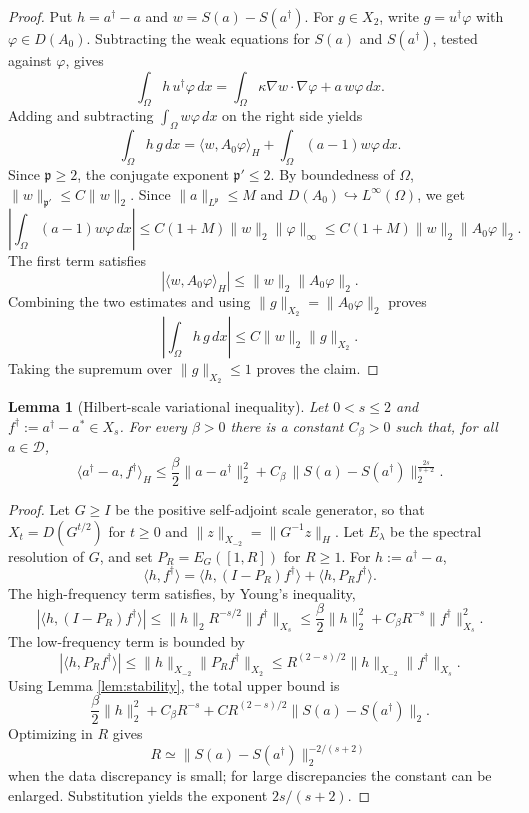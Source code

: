 \documentclass[11pt]{article}
\newtheorem{lemma}{Lemma}
\newcommand{\ip}[2]{\langle #1,#2\rangle}
\newcommand{\fp}{\mathfrak p}
\begin{document}
\begin{proof}
Put \(h=a^\dagger-a\) and \(w=S(a)-S(a^\dagger)\). For \(g\in X_2\), write
\(g=u^\dagger\varphi\) with \(\varphi\in D(A_0)\). Subtracting the weak
equations for \(S(a)\) and \(S(a^\dagger)\), tested against \(\varphi\), gives
\[
  \int_\Omega h\,u^\dagger\varphi\,dx
  =\int_\Omega \kappa\nabla w\cdot\nabla\varphi+a\,w\varphi\,dx .
\]
Adding and subtracting \(\int_\Omega w\varphi\,dx\) on the right side yields
\[
  \int_\Omega h\,g\,dx
  =\ip{w}{A_0\varphi}_H+\int_\Omega (a-1)w\varphi\,dx .
\]
Since \(\fp\ge2\), the conjugate exponent \(\fp'\le2\). By boundedness of
\(\Omega\), \(\|w\|_{\fp'}\leq C\|w\|_2\). Since \(\|a\|_{L^\fp}\le M\) and
\(D(A_0)\hookrightarrow L^\infty(\Omega)\), we get
\[
  \left|\int_\Omega (a-1)w\varphi\,dx\right|
  \leq C(1+M)\|w\|_2\|\varphi\|_\infty
  \leq C(1+M)\|w\|_2\|A_0\varphi\|_2 .
\]
The first term satisfies
\[
  |\ip{w}{A_0\varphi}_H|\leq \|w\|_2\|A_0\varphi\|_2 .
\]
Combining the two estimates and using
\(\|g\|_{X_2}=\|A_0\varphi\|_2\) proves
\[
  \left|\int_\Omega h\,g\,dx\right|
  \leq C\|w\|_2\|g\|_{X_2}.
\]
Taking the supremum over \(\|g\|_{X_2}\leq1\) proves the claim.
\end{proof}

\begin{lemma}[Hilbert-scale variational inequality]\label{lem:vsc}
Let \(0<s\leq2\) and \(f^\dagger:=a^\dagger-a^*\in X_s\). For every
\(\beta>0\) there is a constant \(C_\beta>0\) such that, for all
\(a\in\mathcal D\),
\[
  \ip{a^\dagger-a}{f^\dagger}_H
  \leq \frac{\beta}{2}\|a-a^\dagger\|_2^2
      +C_\beta\,
       \|S(a)-S(a^\dagger)\|_2^{\frac{2s}{s+2}} .
\]
\end{lemma}

\begin{proof}
Let \(G\geq I\) be the positive self-adjoint scale generator, so that
\(X_t=D(G^{t/2})\) for \(t\geq0\) and
\(\|z\|_{X_{-2}}=\|G^{-1}z\|_H\). Let \(E_\lambda\) be the spectral resolution
of \(G\), and set \(P_R=E_G([1,R])\) for \(R\geq1\). For
\(h:=a^\dagger-a\),
\[
  \ip{h}{f^\dagger}
  =\ip{h}{(I-P_R)f^\dagger}+\ip{h}{P_R f^\dagger}.
\]
The high-frequency term satisfies, by Young's inequality,
\[
  |\ip{h}{(I-P_R)f^\dagger}|
  \leq \|h\|_2 R^{-s/2}\|f^\dagger\|_{X_s}
  \leq \frac{\beta}{2}\|h\|_2^2
      +C_\beta R^{-s}\|f^\dagger\|_{X_s}^2 .
\]
The low-frequency term is bounded by
\[
  |\ip{h}{P_R f^\dagger}|
  \leq \|h\|_{X_{-2}}\|P_R f^\dagger\|_{X_2}
  \leq R^{(2-s)/2}\|h\|_{X_{-2}}\|f^\dagger\|_{X_s}.
\]
Using Lemma \ref{lem:stability}, the total upper bound is
\[
  \frac{\beta}{2}\|h\|_2^2
  +C_\beta R^{-s}
  +C R^{(2-s)/2}\|S(a)-S(a^\dagger)\|_2 .
\]
Optimizing in \(R\) gives
\[
  R\simeq \|S(a)-S(a^\dagger)\|_2^{-2/(s+2)}
\]
when the data discrepancy is small; for large discrepancies the constant can
be enlarged. Substitution yields the exponent \(2s/(s+2)\).
\end{proof}
\end{document}

